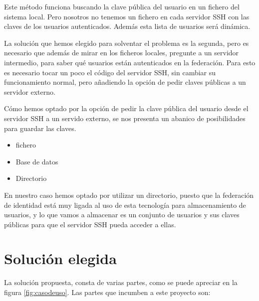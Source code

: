     Este método funciona buscando la clave pública del usuario en un
    fichero del sistema local. Pero nosotros no tenemos un fichero en cada
    servidor SSH con las claves de los usuarios autenticados. Además esta
    lista de usuarios será dinámica.

    La solución que hemos elegido para solventar el problema es la segunda,
    pero es necesario que además de mirar en los ficheros locales, pregunte
    a un servidor intermedio, para saber qué usuarios están autenticados en
    la federación. Para esto es necesario tocar un poco el código del
    servidor SSH, sin cambiar su funcionamiento normal, pero añadiendo la
    opción de pedir claves públicas a un servidor externo.

    Cómo hemos optado por la opción de pedir la clave pública del usuario
    desde el servidor SSH a un servido externo, se nos presenta un abanico
    de posibilidades para guardar las claves.

    \begin{itemize}
    
    \item fichero
    \item Base de datos
    \item Directorio

    \end{itemize}

    En nuestro caso hemos optado por utilizar un directorio, puesto que la
    federación de identidad está muy ligada al uso de esta tecnología para
    almacenamiento de usuarios, y lo que vamos a almacenar es un conjunto
    de usuarios y sus claves públicas para que el servidor SSH pueda
    acceder a ellas.

    \section{Solución elegida}

    La solución propuesta, consta de varias partes, como se puede apreciar
    en la figura \ref{fig:casodeuso}. Las partes que incumben a este
    proyecto son:

